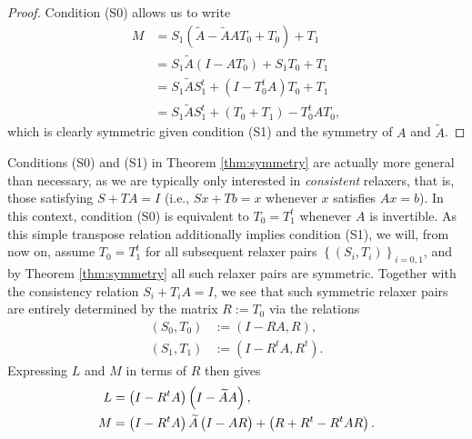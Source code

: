 \documentclass{article}
\begin{document}
\begin{proof}
Condition (S0) allows us to write
\begin{subequations}
\begin{align*}
M & = S_1 \left( \widetilde{A} - \widetilde{A} A T_0 + T_0 \right) + T_1 \\
  & = S_1 \widetilde{A} \left( I - A T_0 \right) + S_1 T_0 + T_1 \\
  & = S_1 \widetilde{A} S_1^t + \left( I - T_0^t A \right) T_0 + T_1 \\
  & = S_1 \widetilde{A} S_1^t + \left( T_0 + T_1 \right) - T_0^t A T_0,
\end{align*}
\end{subequations}
which is clearly symmetric given condition (S1) and the symmetry of $A$ and $\widetilde{A}$.
\end{proof}

Conditions (S0) and (S1) in Theorem \ref{thm:symmetry} are actually more general than necessary, as we are typically only interested in \emph{consistent} relaxers, that is, those satisfying $S + T A = I$ (i.e., $S x + T b = x$ whenever $x$ satisfies $A x = b$). In this context, condition (S0) is equivalent to $T_0 = T_1^t$ whenever $A$ is invertible. As this simple transpose relation additionally implies condition (S1), we will, from now on, assume $T_0 = T_1^t$ for all subsequent relaxer pairs $\left\{ \left( S_i, T_i \right) \right\}_{i = 0,1}$, and by Theorem \ref{thm:symmetry} all such relaxer pairs are symmetric. Together with the consistency relation $S_i + T_i A = I$, we see that such symmetric relaxer pairs are entirely determined by the matrix $R := T_0$ via the relations
\begin{subequations} \label{eq:RST}
\begin{align}
\left( S_0, T_0 \right) & := \left( I - R A, R \right), \\
\left( S_1, T_1 \right) & := \left( I - R^t A, R^t \right).
\end{align}
\end{subequations}
Expressing $L$ and $M$ in terms of $R$ then gives
\begin{subequations} \label{eq:RLM}
\begin{align}
L & = \left( I - R^t A \right) \left( I - \widetilde{A} A \right), \\
M & = \left( I - R^t A \right) \widetilde{A} \left( I - A R \vphantom{I - R^t A} \right) + \left( R + R^t - R^t A R \right).
\end{align}
\end{subequations}
\end{document}
